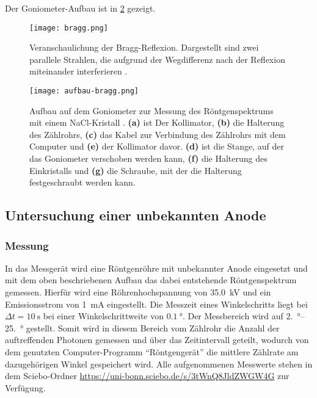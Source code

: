 Der Goniometer-Aufbau ist in \cref{fig:aufbau-bragg} gezeigt.

\begin{figure}[htb]
	\centering
	\texttt{[image: bragg.png]}
	\caption{Veranschaulichung der Bragg-Reflexion. Dargestellt sind zwei parallele Strahlen,
		die aufgrund der Wegdifferenz nach der Reflexion miteinander interferieren \cite{ld_bragg}.}
	\label{fig:bragg}
\end{figure}

\newcommand\ebf[1]{\textbf{(#1)}}
\begin{figure}[htb]
	\centering
	\texttt{[image: aufbau-bragg.png]}
	\caption{Aufbau auf dem Goniometer zur Messung des Röntgenspektrums mit einem NaCl-Kristall \cite{ld_bragg}. \ebf a ist 
	Der Kollimator, \ebf b die Halterung des Zählrohrs, \ebf c das Kabel zur Verbindung des Zählrohrs mit 
	dem Computer und \ebf e der Kollimator davor. \ebf d ist die Stange, auf der das Goniometer verschoben
	werden kann, \ebf f die Halterung des Einkristalls und \ebf g die Schraube, mit der die Halterung 
	festgeschraubt werden kann.}
	\label{fig:aufbau-bragg}
\end{figure}

\subsection{Untersuchung einer unbekannten Anode}\label{sec:unbekannte_anode}
\subsubsection{Messung}
In das Messgerät wird eine Röntgenröhre mit unbekannter Anode eingesetzt und mit dem oben beschriebenen Aufbau
das dabei entstehende Röntgenspektrum gemessen. Hierfür wird eine Röhrenhochspannung von \SI{35.0}{\kilo\volt} und
ein Emissionsstrom von \SI{1}{\milli\ampere} eingestellt. Die Messzeit eines Winkelschritts liegt bei
$\Delta t = \SI{10}{\second}$
bei einer Winkelschrittweite von $\SI{0.1}{\degree}$. Der Messbereich wird auf \qtyrange{2.}{25.}{\degree} gestellt.
Somit wird in diesem Bereich vom Zählrohr die Anzahl der auftreffenden Photonen gemessen
und über das Zeitintervall geteilt, wodurch von dem genutzten Computer-Programm
\enquote{Röntgengerät} die mittlere Zählrate am dazugehörigen Winkel gespeichert wird. Alle
aufgenommenen Messwerte stehen in dem Sciebo-Ordner \url{https://uni-bonn.sciebo.de/s/3tWnQ8JldZWGW4G}
zur Verfügung.

